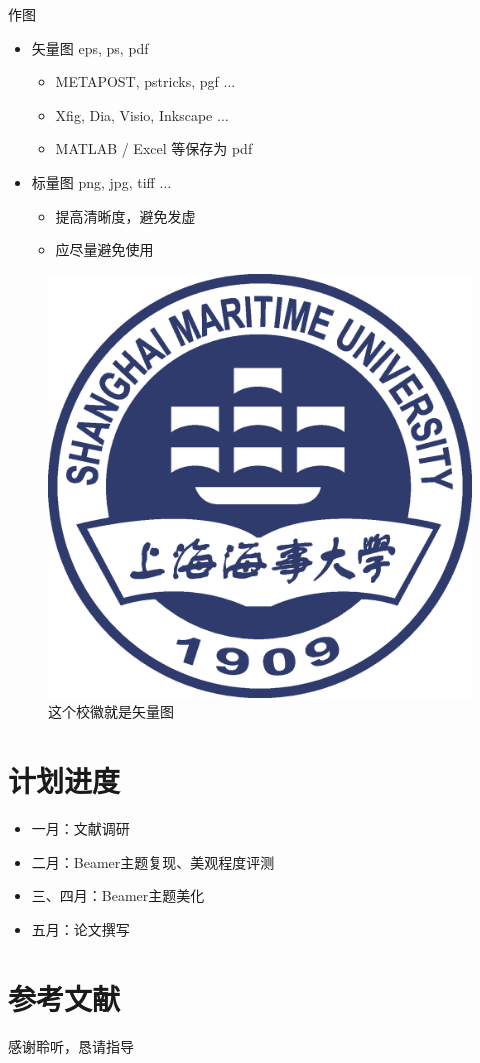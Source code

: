 \documentclass{beamer}
\begin{document}
	\begin{frame}{作图}
		\begin{itemize}
			\item 矢量图 eps, ps, pdf
			\begin{itemize}
				\item METAPOST, pstricks, pgf $\ldots$
				\item Xfig, Dia, Visio, Inkscape $\ldots$
				\item MATLAB / Excel 等保存为 pdf
			\end{itemize}
			\item 标量图 png, jpg, tiff $\ldots$
			\begin{itemize}
				\item 提高清晰度，避免发虚
				\item 应尽量避免使用
			\end{itemize}
		\end{itemize}
		\begin{figure}[htpb]
			\centering
			\includegraphics[width=0.2\linewidth]{Template/Pic/Shanghai_Maritime_University_Logo.eps}
			\caption{这个校徽就是矢量图}
		\end{figure}
	\end{frame}

	\section{计划进度}
	\begin{frame}
		\begin{itemize}
			\item 一月：文献调研
			\item 二月：Beamer主题复现、美观程度评测
			\item 三、四月：Beamer主题美化
			\item 五月：论文撰写
		\end{itemize}
	\end{frame}

	\section{参考文献}

	\begin{frame}[allowframebreaks]
		
		
	\end{frame}

	\begin{frame}
		\begin{center}
			{\Huge 感谢聆听，恳请指导}
		\end{center}
	\end{frame}
\end{document}
